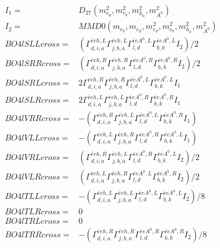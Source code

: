 \documentclass[A4,landscape]{article}
\begin{document}
\begin{align} 
I_1 = & D_{27}(m^2_{e_{{d}}}, m^2_{e_{{b}}}, m^2_{h_{{a}}}, m^2_{A^0}) \\ 
I_2 = & MMD0(m_{e_{{b}}}, m_{e_{{d}}}, m^2_{e_{{d}}}, m^2_{e_{{b}}}, m^2_{h_{{a}}}, m^2_{A^0}) \\ 
  BO4lSLLcross= & ( \Gamma^{\bar{e}e h ,L}_{d, i, a} \Gamma^{\bar{e}e h ,L}_{j, b, a} \Gamma^{\bar{e}e A^0 ,L}_{l, d} \Gamma^{\bar{e}e A^0 ,L}_{b, k} I_2)/2 \\ 
  BO4lSRRcross= & ( \Gamma^{\bar{e}e h ,R}_{d, i, a} \Gamma^{\bar{e}e h ,R}_{j, b, a} \Gamma^{\bar{e}e A^0 ,R}_{l, d} \Gamma^{\bar{e}e A^0 ,R}_{b, k} I_2)/2 \\ 
  BO4lSRLcross= & 2  \Gamma^{\bar{e}e h ,R}_{d, i, a} \Gamma^{\bar{e}e h ,R}_{j, b, a} \Gamma^{\bar{e}e A^0 ,L}_{l, d} \Gamma^{\bar{e}e A^0 ,L}_{b, k} I_1 \\ 
  BO4lSLRcross= & 2  \Gamma^{\bar{e}e h ,L}_{d, i, a} \Gamma^{\bar{e}e h ,L}_{j, b, a} \Gamma^{\bar{e}e A^0 ,R}_{l, d} \Gamma^{\bar{e}e A^0 ,R}_{b, k} I_1 \\ 
  BO4lVRRcross= & -( \Gamma^{\bar{e}e h ,R}_{d, i, a} \Gamma^{\bar{e}e h ,L}_{j, b, a} \Gamma^{\bar{e}e A^0 ,L}_{l, d} \Gamma^{\bar{e}e A^0 ,R}_{b, k} I_1) \\ 
  BO4lVLLcross= & -( \Gamma^{\bar{e}e h ,L}_{d, i, a} \Gamma^{\bar{e}e h ,R}_{j, b, a} \Gamma^{\bar{e}e A^0 ,R}_{l, d} \Gamma^{\bar{e}e A^0 ,L}_{b, k} I_1) \\ 
  BO4lVRLcross= & ( \Gamma^{\bar{e}e h ,R}_{d, i, a} \Gamma^{\bar{e}e h ,L}_{j, b, a} \Gamma^{\bar{e}e A^0 ,R}_{l, d} \Gamma^{\bar{e}e A^0 ,L}_{b, k} I_2)/2 \\ 
  BO4lVLRcross= & ( \Gamma^{\bar{e}e h ,L}_{d, i, a} \Gamma^{\bar{e}e h ,R}_{j, b, a} \Gamma^{\bar{e}e A^0 ,L}_{l, d} \Gamma^{\bar{e}e A^0 ,R}_{b, k} I_2)/2 \\ 
  BO4lTLLcross= & -( \Gamma^{\bar{e}e h ,L}_{d, i, a} \Gamma^{\bar{e}e h ,L}_{j, b, a} \Gamma^{\bar{e}e A^0 ,L}_{l, d} \Gamma^{\bar{e}e A^0 ,L}_{b, k} I_2)/8 \\ 
  BO4lTLRcross= & 0 \\ 
  BO4lTRLcross= & 0 \\ 
  BO4lTRRcross= & -( \Gamma^{\bar{e}e h ,R}_{d, i, a} \Gamma^{\bar{e}e h ,R}_{j, b, a} \Gamma^{\bar{e}e A^0 ,R}_{l, d} \Gamma^{\bar{e}e A^0 ,R}_{b, k} I_2)/8 \\ 
\end{align} 
\end{document}
